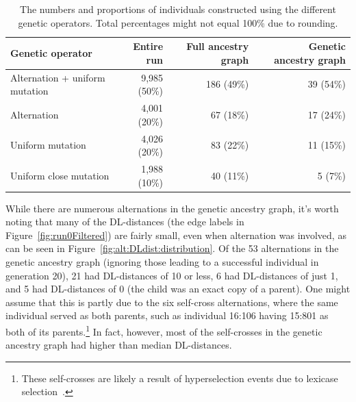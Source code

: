 \documentclass[graybox]{svmult}
\begin{document}
\begin{table}[t]
	\begin{tabular}{lrrr}
		\textbf{Genetic operator} & \textbf{Entire run} & $\;$ \textbf{Full ancestry graph} & $\;$ \textbf{Genetic ancestry graph} \\ 
		\hline
		Alternation + uniform mutation & 9,985 (50\%) & 186 (49\%) & 39 (54\%) \\ 
		Alternation & 4,001 (20\%) & 67 (18\%) & 17 (24\%) \\ 
		Uniform mutation & 4,026 (20\%) & 83 (22\%) & 11 (15\%) \\ 
		Uniform close mutation & 1,988 (10\%) & 40 (11\%) & 5 (7\%)
	\end{tabular} 
	\caption{The numbers and proportions of individuals constructed using
		the different genetic operators. Total percentages might not equal 100\% due to rounding.}
	\label{tab:operatorCounts}
\end{table}

While there are numerous alternations in the genetic ancestry graph, it's worth
noting that many of the DL-distances (the edge labels in 
Figure~\ref{fig:run0Filtered}) are fairly small, even when alternation was
involved, as can be seen in Figure~\ref{fig:alt:DLdist:distribution}. Of the
53 alternations in the genetic ancestry graph
(ignoring those leading to a successful individual in 
generation 20), 21 had DL-distances of 10 or less, 6 had DL-distances of just 1,
and 5 had DL-distances of 0 (the child was an exact copy of a parent).
One might assume that this is partly due to the six 
self-cross alternations, where the same individual served as both parents, 
such as individual 16:106 having 15:801 as both of its parents.\footnote{These self-crosses are likely a result of hyperselection events due to lexicase 
	selection~\cite{Helmuth:2016:GECCO}.} In fact, however, most of the 
self-crosses in the genetic ancestry graph had higher than median DL-distances.
\end{document}
